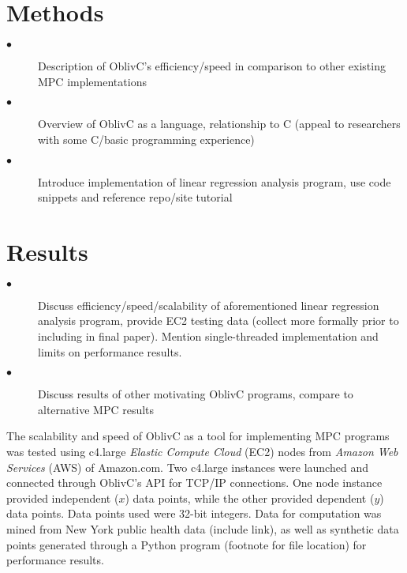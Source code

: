 \documentclass{article}
\begin{document}
\section{Methods}
\begin{description}
\item[$\bullet$] Description of OblivC’s efficiency/speed in comparison to other existing MPC implementations
\item[$\bullet$] Overview of OblivC as a language, relationship to C (appeal to researchers with some C/basic programming experience) 
\item[$\bullet$] Introduce implementation of linear regression analysis program, use code snippets and reference repo/site tutorial
\end{description}
\section{Results}
\begin{description}
\item[$\bullet$] Discuss efficiency/speed/scalability of aforementioned linear regression analysis program, provide EC2 testing data (collect more formally prior to including in final paper). Mention single-threaded implementation and limits on performance results.
\item[$\bullet$] Discuss results of other motivating OblivC programs, compare to alternative MPC results
\end{description}

The scalability and speed of OblivC as a tool for implementing MPC programs was tested using c4.large \emph{Elastic Compute Cloud} (EC2) nodes from \emph{Amazon Web Services} (AWS) of Amazon.com\textregistered. Two c4.large instances were launched and connected through OblivC's API for TCP/IP connections. One node instance provided independent ($x$) data points, while the other provided dependent ($y$) data points. Data points used were 32-bit integers. Data for computation was mined from New York public health data (include link), as well as synthetic data points generated through a Python program (footnote for file location) for performance results.

\begin{center}
\end{center}
\end{document}
